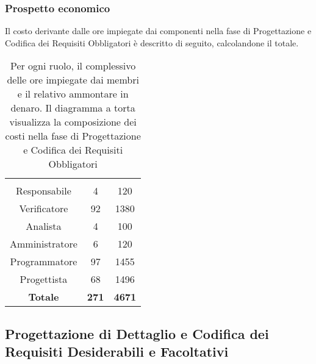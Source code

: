 \subsubsection{Prospetto economico}
Il costo derivante dalle ore impiegate dai componenti nella fase di Progettazione e Codifica dei Requisiti Obbligatori è descritto di seguito, calcolandone il totale.

\begin{table}[H]
	{\setlength{\parindent}{0cm}
		\begin{minipage}{.43\textwidth}
			\begin{tabular}{ccc}
				\rowcolorhead
				\headertitle{Ruolo} & \headertitle{Ore} & \headertitle{Costo(€)}\\
				Responsabile & 4 & 120\\
				Verificatore & 92 & 1380\\
				Analista & 4 & 100\\
				Amministratore & 6 & 120\\
				Programmatore & 97 & 1455\\
				Progettista & 68 & 1496\\
				\hline
				\textbf{Totale} & \textbf{271} & \textbf{4671}\\
			\end{tabular}
		\end{minipage}%
		\begin{minipage}{.57\textwidth}
	\end{minipage} }
	\caption[Prospetto economico della fase di Progettazione e Codifica dei Requisiti Obbligatori]{Per ogni ruolo, il complessivo delle ore impiegate dai membri e il relativo ammontare in denaro. Il diagramma a torta visualizza la composizione dei costi nella fase di Progettazione e Codifica dei Requisiti Obbligatori}
\end{table} 




\subsection{Progettazione di Dettaglio e Codifica dei Requisiti Desiderabili e Facoltativi}



